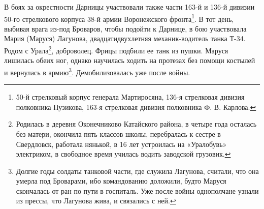В боях за окрестности Дарницы участвовали также части 163-й и 136-й дивизии 50-го стрелкового корпуса 38-й армии Воронежского фронта\footnote{50-й стрелковый корпус генерала Мартиросяна, 136-я стрелковая дивизия полковника Пузикова, 163-я стрелковая   дивизия полковника Ф. В. Карлова.}. В тот день, выбивая врага из-под Броваров, чтобы подойти к Дарнице, в бою участвовала Мария (Маруся) Лагунова, двадцатидвухлетняя механик-водитель танка Т-34. Родом с Урала\footnote{Родилась в деревня Оконечниково Катайского района, в четыре года осталась без матери, окончила пять классов школы, перебралась к сестре в Свердловск, работала нянькой, в 16 лет устроилась на «Уралобувь» электриком, в свободное время училась водить заводской грузовик.}, доброволец. Фрицы подбили ее танк из пушки. Маруся лишилась обеих ног, однако научилась ходить на протезах без помощи костылей и вернулась в армию\footnote{Долгие годы солдаты танковой части, где служила Лагунова, считали, что она умерла под Броварами, ибо командованию доложили, будто Маруся скончалась от ран по пути в госпиталь. Уже после войны однополчане узнали из прессы, что Лагунова жива, и связались с ней.}. Демобилизовалась уже после войны.

